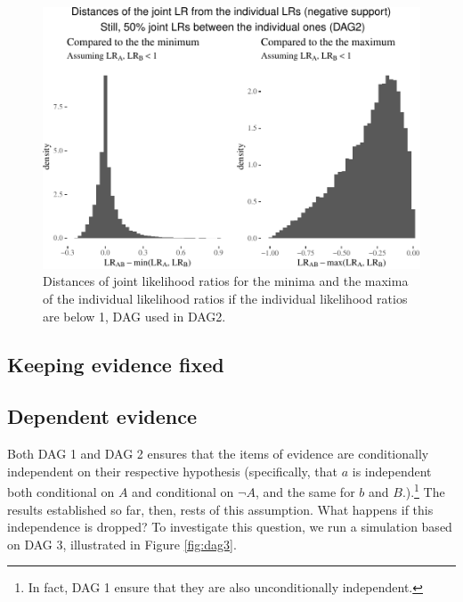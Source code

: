 \documentclass[
  10pt,
  dvipsnames,enabledeprecatedfontcommands]{scrartcl}
\newcommand{\n}{\neg}
\begin{document}
\begin{figure}


\begin{center}\includegraphics[width=1\linewidth]{conjunction-appendix14_files/figure-latex/unnamed-chunk-25-1} \end{center}

\caption{Distances of joint likelihood ratios for the minima and the maxima of the individual likelihood ratios if the individual likelihood ratios are below 1, DAG used in \textsf{DAG2}.} 
\label{fig:LRlowerPlot2}
\end{figure}

\hypertarget{keeping-evidence-fixed}{%
\subsection{Keeping evidence fixed}\label{keeping-evidence-fixed}}

\hypertarget{dependent-evidence}{%
\subsection*{Dependent evidence}\label{dependent-evidence}}

Both \textsf{DAG 1} and \textsf{DAG 2} ensures that the items of
evidence are conditionally independent on their respective hypothesis
(specifically, that \(a\) is independent both conditional on \(A\) and
conditional on \(\n A\), and the same for \(b\) and \(B\).).\footnote{In
  fact, \textsf{DAG 1} ensure that they are also unconditionally
  independent.} The results established so far, then, rests of this
assumption. What happens if this independence is dropped? To investigate
this question, we run a simulation based on \textsf{DAG 3}, illustrated
in Figure \ref{fig:dag3}.
\end{document}
